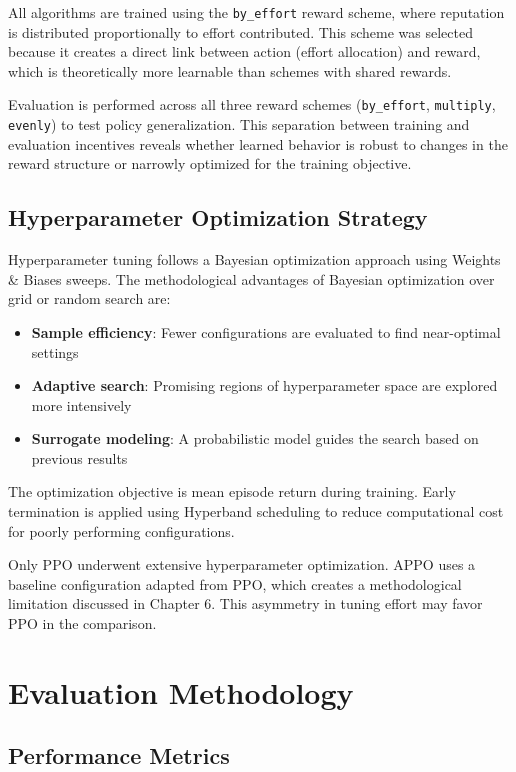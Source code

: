 \documentclass[english,bachelor]{hsluthesis}
\begin{document}
All algorithms are trained using the \texttt{by\_effort} reward scheme, where reputation is distributed proportionally to effort contributed. This scheme was selected because it creates a direct link between action (effort allocation) and reward, which is theoretically more learnable than schemes with shared rewards.

Evaluation is performed across all three reward schemes (\texttt{by\_effort}, \texttt{multiply}, \texttt{evenly}) to test policy generalization. This separation between training and evaluation incentives reveals whether learned behavior is robust to changes in the reward structure or narrowly optimized for the training objective.

\subsection{Hyperparameter Optimization Strategy}

Hyperparameter tuning follows a Bayesian optimization approach using Weights \& Biases sweeps. The methodological advantages of Bayesian optimization over grid or random search are:

\begin{itemize}
    \item \textbf{Sample efficiency}: Fewer configurations are evaluated to find near-optimal settings
    \item \textbf{Adaptive search}: Promising regions of hyperparameter space are explored more intensively
    \item \textbf{Surrogate modeling}: A probabilistic model guides the search based on previous results
\end{itemize}

The optimization objective is mean episode return during training. Early termination is applied using Hyperband scheduling to reduce computational cost for poorly performing configurations.

Only PPO underwent extensive hyperparameter optimization. APPO uses a baseline configuration adapted from PPO, which creates a methodological limitation discussed in Chapter 6. This asymmetry in tuning effort may favor PPO in the comparison.

\section{Evaluation Methodology}

\subsection{Performance Metrics}
\end{document}
